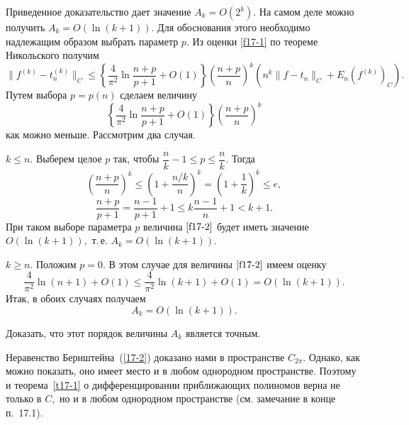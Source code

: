  \begin{Remark} %
 Приведенное  доказательство дает значение $A_k=O(2^k).$ На самом деле можно получить   $A_k=O(\ln(k+1)).$
 Для обоснования этого необходимо   надлежащим образом выбрать
 параметр $p.$ Из оценки {\eqref{f17-1}}  по теореме
 Никольского получим
 $$
 \|f^{(k)}-t_n^{(k)}\|_C\le \left\{ \frac{4}{\pi^2}\ln
 \frac{n+p}{p+1}+O(1) \right\} \left( \frac{n+p}{n}\right)^k \left(
 n^k \|f-t_n\|_C+E_n (f^{(k)})_C\right).
 $$
 Путем выбора $p=p(n)$ сделаем величину
  \begin{equation}\label{f17-2}
\left\{ \frac{4}{\pi^2}\ln \frac{n+p}{p+1}+O(1)\right\} \left(
 \frac{n+p}{n}\right)^k %
  \end{equation}
 как можно меньше. Рассмотрим два случая.

 {\Case $k\le n.$} Выберем целое $p$ так, чтобы $\dfrac{n}{k}-1\le p\le \dfrac{n}{k}.$
 Тогда
 $$
 \left( \frac{n+p}{n}\right)^k \le \left( 1+
 \frac{{n}/{k}}{n}\right)^k = \left(
 1+\frac{1}{k}\right)^k\le e,
 $$
 $$
 \frac{n+p}{p+1}=\frac{n-1}{p+1}+1\le k\frac{n-1}{n}+1< k+1.
 $$
 При таком выборе параметра $p$ величина {$\eqref{f17-2}$}
 будет иметь значение   $O(\ln(k+1)),$ т.\,е. $A_k=O(\ln(k+1)).$

 {\Case $k\ge n.$}
 \noindent  Положим $p=0.$ В этом случае для величины {$\eqref{f17-2}$}  имеем {оценку}
 $$
 \frac{4}{\pi^2} \ln (n+1)+O(1)\le
 \frac{4}{\pi^2} \ln (k+1)+O(1)=O(\ln(k+1)).
 $$
 Итак, в обоих случаях получаем
 $$
 A_k=O(\ln(k+1)).
 $$
 \end{Remark}

 \task %
 Доказать, что этот порядок величины $A_k$ является точным.

 \begin{Remark} %
 Неравенство Бернштейна~(\ref{17-2}) доказано нами в пространстве $C_{2\pi}.$
 Однако, как можно показать, оно имеет место и в любом однородном пространстве. Поэтому и
 теорема~\ref{t17-1} о дифференцировании приближающих полиномов
 верна не только в $C,$ но и в любом однородном пространстве (см. замечание в конце п.~17.1).
 \end{Remark}
